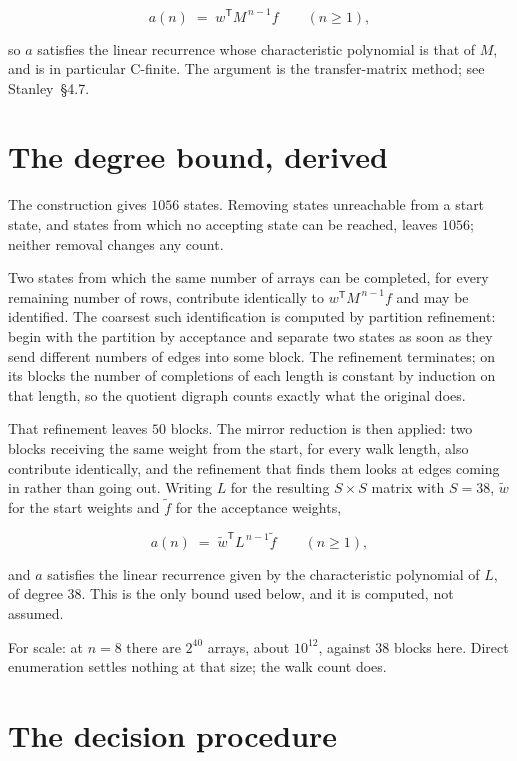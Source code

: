 \documentclass[11pt]{article}
\theoremstyle{definition}
\begin{document}
\[a(n) \;=\; w^{\mathsf T} M^{\,n-1} f \qquad (n \ge 1),\]

so $a$ satisfies the linear recurrence whose characteristic polynomial is that of $M$, and is in particular C-finite. The argument is the transfer-matrix method; see Stanley~\S4.7.

\section{The degree bound, derived}

The construction gives $1056$ states. Removing states unreachable from a start state, and states from which no accepting state can be reached, leaves $1056$; neither removal changes any count.

Two states from which the same number of arrays can be completed, for every remaining number of rows, contribute identically to $w^{\mathsf T}M^{\,n-1}f$ and may be identified. The coarsest such identification is computed by partition refinement: begin with the partition by acceptance and separate two states as soon as they send different numbers of edges into some block. The refinement terminates; on its blocks the number of completions of each length is constant by induction on that length, so the quotient digraph counts exactly what the original does.

That refinement leaves $50$ blocks. The mirror reduction is then applied: two blocks receiving the same weight from the start, for every walk length, also contribute identically, and the refinement that finds them looks at edges coming in rather than going out. Writing $L$ for the resulting $S \times S$ matrix with $S = 38$, $\tilde w$ for the start weights and $\tilde f$ for the acceptance weights,

\[a(n) \;=\; \tilde w^{\mathsf T} L^{\,n-1} \tilde f \qquad (n \ge 1),\]

and $a$ satisfies the linear recurrence given by the characteristic polynomial of $L$, of degree $38$. This is the only bound used below, and it is computed, not assumed.

For scale: at $n = 8$ there are $2^{40}$ arrays, about $10^{12}$, against $38$ blocks here. Direct enumeration settles nothing at that size; the walk count does.

\section{The decision procedure}
\end{document}
